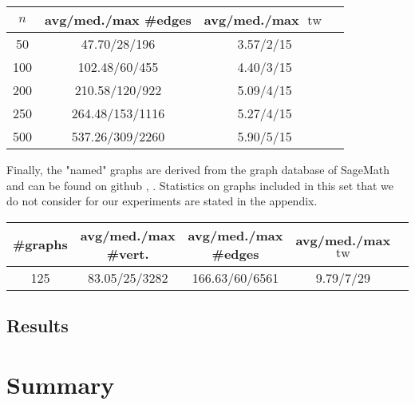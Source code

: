 \documentclass[11pt,a4paper]{article}
\DeclareMathOperator{\tw}{tw}
\begin{document}
\begin{table}[h!]
\begin{tabular}{|c|c|c|c|}
\hline
$n$ & avg/med./max \#edges & avg/med./max $\tw$ \\
\hline \hline
50 & 47.70/28/196 & 3.57/2/15 \\
\hline
100 & 102.48/60/455 & 4.40/3/15 \\
\hline
200 & 210.58/120/922 & 5.09/4/15 \\
\hline
250 & 264.48/153/1116 & 5.27/4/15 \\
\hline
500 & 537.26/309/2260 & 5.90/5/15 \\
\hline
\end{tabular}
\end{table}

Finally, the "named" graphs are derived from the graph database of SageMath and can be found on github \cite{sage}, \cite{named_graphs}. Statistics on graphs included in this set that we do not consider for our experiments are stated in the appendix. \\

\begin{table}[h!]
\begin{tabular}{|c|c|c|c|c|}
\hline
\#graphs & avg/med./max \#vert. & avg/med./max \#edges & avg/med./max $\tw$ \\
\hline \hline
125 & 83.05/25/3282 & 166.63/60/6561 & 9.79/7/29 \\
\hline
\end{tabular}
\end{table}

\subsection{Results}


\section{Summary}



\end{document}

